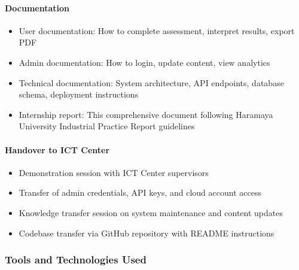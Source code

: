 \documentclass[12pt, a4paper]{article}
\begin{document}
\paragraph{Documentation}
\begin{itemize}[leftmargin=1.5em, itemsep=3pt]
    \item User documentation: How to complete assessment, interpret results, export PDF
    \item Admin documentation: How to login, update content, view analytics
    \item Technical documentation: System architecture, API endpoints, database schema, deployment instructions
    \item Internship report: This comprehensive document following Haramaya University Industrial Practice Report guidelines
\end{itemize}

\paragraph{Handover to ICT Center}
\begin{itemize}[leftmargin=1.5em, itemsep=3pt]
    \item Demonstration session with ICT Center supervisors
    \item Transfer of admin credentials, API keys, and cloud account access
    \item Knowledge transfer session on system maintenance and content updates
    \item Codebase transfer via GitHub repository with README instructions
\end{itemize}

\subsubsection*{Tools and Technologies Used}
\end{document}
